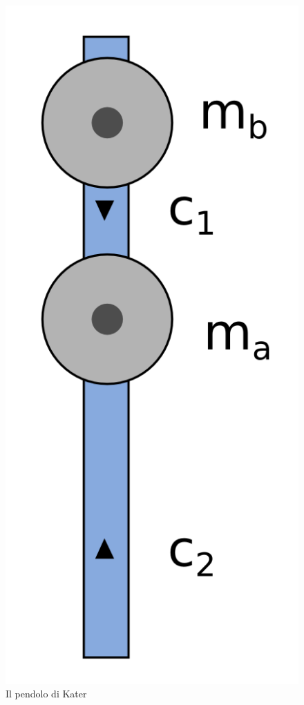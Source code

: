 \begin{figure}
  \begin{center}
\includegraphics[scale=0.7]{../grafici/kater/kater.png}
  \end{center}
  \caption*{Il pendolo di Kater}
\end{figure}


